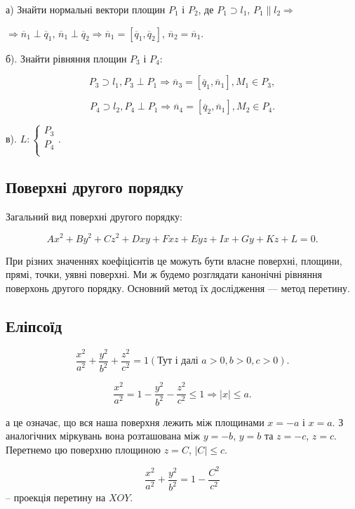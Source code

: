 а) Знайти нормальні вектори площин $P_1$ і $P_2$, де $P_1 \supset l_1$, $P_1 \parallel l_2 \Rightarrow$

$\Rightarrow \overline{n}_1 \perp \overline{q}_1$, $\overline{n}_1 \perp \overline{q}_2 \Rightarrow \overline{n}_1 = [\overline{q}_1,\overline{q}_2]$, $\overline{n}_2 = \overline{n}_1$.

б). Знайти рівняння площин $P_3$ і $P_4$:

$$P_3 \supset l_1, P_3 \perp P_1 \Rightarrow \overline{n}_3 = [\overline{q}_1,\overline{n}_1], M_1 \in P_3,$$

$$P_4 \supset l_2, P_4 \perp P_1 \Rightarrow \overline{n}_4 = [\overline{q}_2,\overline{n}_1], M_2 \in P_4.$$


в). $L: \left\{ \begin{matrix}
	P_3 \\
	P_4 \\
\end{matrix} \right. .$


\subsection{Поверхні другого порядку}

Загальний вид поверхні другого порядку:

$$Ax^2 + By^2 + Cz^2 + Dxy + Fxz + Eyz + Ix + Gy + Kz + L = 0.$$

При різних значеннях коефіцієнтів це можуть бути власне поверхні,
площини, прямі, точки, уявні поверхні. Ми ж будемо розглядати канонічні
рівняння поверхонь другого порядку. Основний метод їх дослідження ---
метод перетину.


\subsection{Еліпсоїд}

$$\dfrac{x^2}{a^2} + \dfrac{y^2}{b^2} + \dfrac{z^2}{c^2} = 1 (\text{Тут і далі } a  > 0, b > 0 , c > 0).$$

$$\dfrac{x^2}{a^2} = 1 - \dfrac{y^2}{b^2} - \dfrac{z^2}{c^2} \leqslant 1 \Rightarrow |x| \leqslant a.$$


а це означає, що вся наша поверхня лежить між площинами $x = - a$ і
$x = a$. З аналогічних міркувань вона розташована між $y = -b$, $y = b$ та $z = -c$,
$z = c$. Перетнемо цю поверхню площиною $z = C$, $|C| \leqslant c$.

$$\dfrac{x^2}{a^2} + \dfrac{y^2}{b^2} = 1 - \dfrac{C^2}{c^2}$$ -- проекція перетину на $XOY$.


